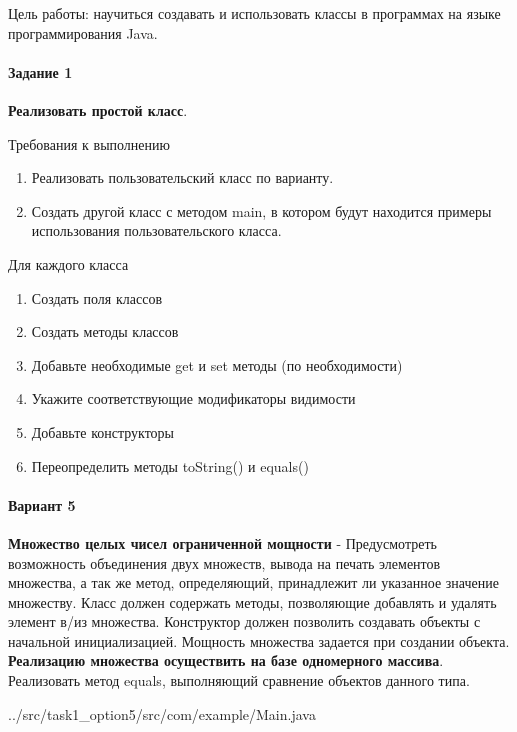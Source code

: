Цель работы:
научиться создавать и использовать классы в программах на языке программирования Java.


\paragraph{Задание 1} \hspace{0pt}

\textbf{Реализовать простой класс}.

Требования к выполнению
\begin{enumerate}
    \item Реализовать пользовательский класс по варианту.
    \item Создать другой класс с методом main,
    в котором будут находится примеры использования пользовательского класса.
\end{enumerate}

Для каждого класса
\begin{enumerate}
    \item Создать поля классов
    \item Создать методы классов
    \item Добавьте необходимые get и set методы (по необходимости)
    \item Укажите соответствующие модификаторы видимости
    \item Добавьте конструкторы
    \item Переопределить методы toString() и equals()
\end{enumerate}

\paragraph{Вариант 5} \hspace{0pt}

\textbf{Множество целых чисел ограниченной мощности}
- Предусмотреть возможность объединения двух множеств,
вывода на печать элементов множества,
а так же метод, определяющий,
принадлежит ли указанное значение множеству.
Класс должен содержать методы,
позволяющие добавлять и удалять элемент в/из множества.
Конструктор должен позволить создавать объекты с начальной инициализацией.
Мощность множества задается при создании объекта.
\textbf{Реализацию множества осуществить на базе одномерного массива}.
Реализовать метод equals, выполняющий сравнение объектов данного типа.


{../src/task1_option5/src/com/example/Main.java}

